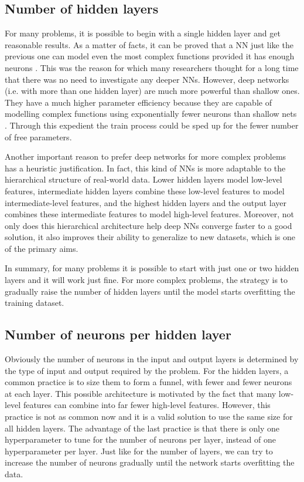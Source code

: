 \subsection{Number of hidden layers}
For many problems, it is possible to begin with a single hidden layer and get reasonable results. As a matter of facts, it can be proved that a NN just like the previous one can model even the most complex functions provided it has enough neurons \cite{hanin}. This was the reason for which many researchers thought for a long time that there was no need to investigate any deeper NNs. However, deep networks (i.e. with more than one hidden layer) are much more powerful than shallow ones. They have a much higher parameter efficiency because they are capable of modelling complex functions using exponentially fewer neurons than shallow nets \cite{oreilly}. Through this expedient the train process could be sped up for the fewer number of free parameters.

Another important reason to prefer deep networks for more complex problems has a heuristic justification. In fact, this kind of NNs is more adaptable to the hierarchical structure of real-world data. Lower hidden layers model low-level features, intermediate hidden layers combine these low-level features to model intermediate-level features, and the highest hidden layers and the output layer combines these intermediate features to model high-level features. Moreover, not only does this hierarchical architecture help deep NNs converge faster to a good solution, it also improves their ability to generalize to new datasets, which is one of the primary aims.

In summary, for many problems it is possible to start with just one or two hidden layers and it will work just fine. For more complex problems, the strategy is to gradually raise the number of hidden layers until the model starts overfitting the training dataset.



\subsection{Number of neurons per hidden layer}
Obviously the number of neurons in the input and output layers is determined by the type of input and output required by the problem. For the hidden layers, a common practice is to size them to form a funnel, with fewer and fewer neurons at each layer. This possible architecture is motivated by the fact that many low-level features can combine into far fewer high-level features. However, this practice is not as common now and it is a valid solution to use the same size for all hidden layers. The advantage of the last practice is that there is only one hyperparameter to tune for the number of neurons per layer, instead of one hyperparameter per layer. Just like for the number of layers, we can try to increase the number of neurons gradually until the network starts overfitting the data.


